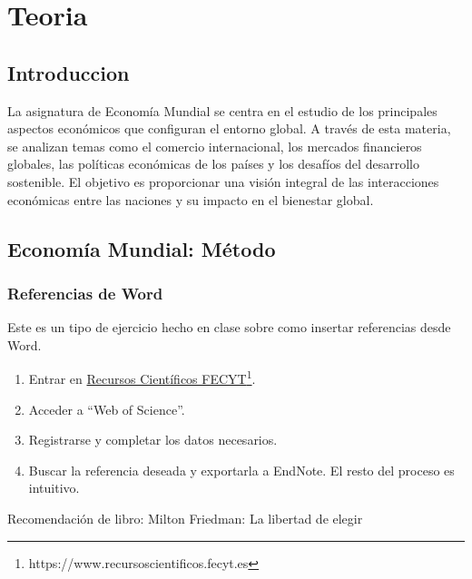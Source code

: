 \documentclass[12pt]{report} %
\begin{document}
\part{Teoria}

\hypertarget{introduccion}{%
\chapter{Introduccion}\label{introduccion}}

La asignatura de Economía Mundial se centra en el estudio de los
principales aspectos económicos que configuran el entorno global. A
través de esta materia, se analizan temas como el comercio
internacional, los mercados financieros globales, las políticas
económicas de los países y los desafíos del desarrollo sostenible. El
objetivo es proporcionar una visión integral de las interacciones
económicas entre las naciones y su impacto en el bienestar global.

\hypertarget{economuxeda-mundial-muxe9todo}{%
\chapter{Economía Mundial: Método}\label{economuxeda-mundial-muxe9todo}}

\hypertarget{referencias-de-word}{%
\section{Referencias de Word}\label{referencias-de-word}}

\begin{ejercicio}

Este es un tipo de ejercicio hecho en clase sobre como insertar referencias desde Word.

\begin{enumerate}
   \item Entrar en \href{https://www.recursoscientificos.fecyt.es}{Recursos Científicos FECYT}\footnote{https://www.recursoscientificos.fecyt.es}.
   \item Acceder a “Web of Science”.
   \item Registrarse y completar los datos necesarios.
   \item Buscar la referencia deseada y exportarla a EndNote. El resto del proceso es intuitivo.
\end{enumerate}

Recomendación de libro: Milton Friedman: La libertad de elegir

\end{ejercicio}
\end{document}
